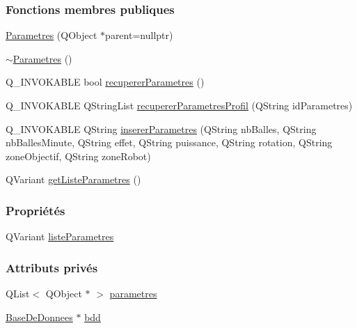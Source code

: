 \subsubsection*{Fonctions membres publiques}
\begin{DoxyCompactItemize}
\item 
\hyperlink{class_parametres_a5197a69e0f07e253e6119b4af95344f4}{Parametres} (Q\+Object $\ast$parent=nullptr)
\item 
\hyperlink{class_parametres_a83068e95596ef05b4307b43b67ffc24d}{$\sim$\+Parametres} ()
\item 
Q\+\_\+\+I\+N\+V\+O\+K\+A\+B\+LE bool \hyperlink{class_parametres_a853872796d32655f3f1ffc090b6d076a}{recuperer\+Parametres} ()
\item 
Q\+\_\+\+I\+N\+V\+O\+K\+A\+B\+LE Q\+String\+List \hyperlink{class_parametres_ac91b8cb3a293f27eeb7d87673889de15}{recuperer\+Parametres\+Profil} (Q\+String id\+Parametres)
\item 
Q\+\_\+\+I\+N\+V\+O\+K\+A\+B\+LE Q\+String \hyperlink{class_parametres_a0102cadfb1bce5a8e82d6c12661fccf8}{inserer\+Parametres} (Q\+String nb\+Balles, Q\+String nb\+Balles\+Minute, Q\+String effet, Q\+String puissance, Q\+String rotation, Q\+String zone\+Objectif, Q\+String zone\+Robot)
\item 
Q\+Variant \hyperlink{class_parametres_a1cd756fd21518bcec9349c08a2a3b08f}{get\+Liste\+Parametres} ()
\end{DoxyCompactItemize}
\subsubsection*{Propriétés}
\begin{DoxyCompactItemize}
\item 
Q\+Variant \hyperlink{class_parametres_ab37e24ed02c5ff1ffc7bea41016c93ca}{liste\+Parametres}
\end{DoxyCompactItemize}
\subsubsection*{Attributs privés}
\begin{DoxyCompactItemize}
\item 
Q\+List$<$ Q\+Object $\ast$ $>$ \hyperlink{class_parametres_a3bff192351dd25f4109b258e954cecbf}{parametres}
\item 
\hyperlink{class_base_de_donnees}{Base\+De\+Donnees} $\ast$ \hyperlink{class_parametres_a1e21034f7e758d93974e0dc070d47dee}{bdd}
\end{DoxyCompactItemize}


